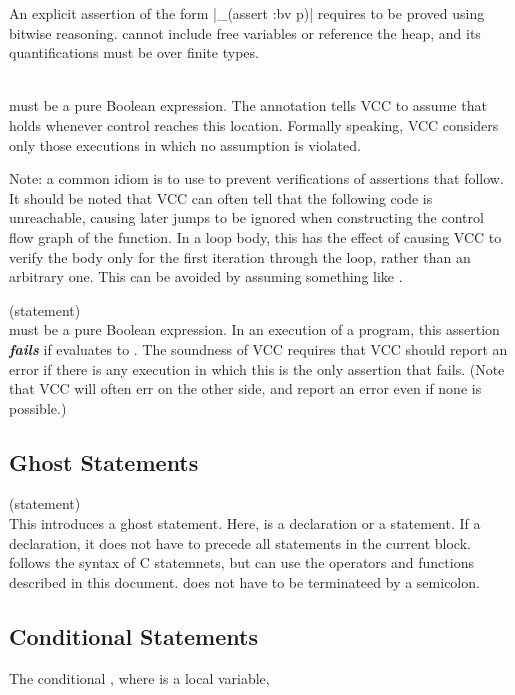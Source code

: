 \documentclass[preprint,nocopyrightspace]{sigplanconf}
\newcommand{\Def}[1]{\textit{\textbf{#1}}}
\begin{document}
{{{An explicit assertion of the form \vcc|_(assert {:bv} p)|
requires  to be proved using bitwise reasoning. 
cannot include free variables or reference the heap, and its
quantifications must be over finite types.

\\
 must be a pure Boolean
expression. The annotation tells VCC to assume that  holds
whenever control reaches this location. Formally speaking, VCC
considers only those executions in which no assumption is violated.

Note: a common idiom is to use  to prevent
verifications of assertions that follow. It should be noted that VCC
can often tell that the following code is unreachable, causing later
jumps to be ignored when constructing the control flow graph of the
function. In a loop body, this has the effect of causing VCC to verify
the body only for the first iteration through the loop, rather than an
arbitrary one. This can be avoided by assuming something like 
.

 (statement)\\
 must be a pure Boolean
expression. In an execution of a program, this assertion \Def{fails}
if  evaluates to . The soundness of VCC requires that
VCC should report an error if there is any execution in which this is
the only assertion that fails. (Note that VCC will often err on the
other side, and report an error even if none is possible.)

\subsection{Ghost Statements}
 (statement)\\
This introduces a ghost statement.
Here,  is a declaration or a statement. If a declaration,
it does not have to precede all statements in the current block.
 follows the syntax of C statemnets, but can use the
operators and functions described in this document.  does
not have to be terminateed by a semicolon.

\subsection{Conditional Statements}
The conditional , where  is a local
variable,

}}}
\end{document}
